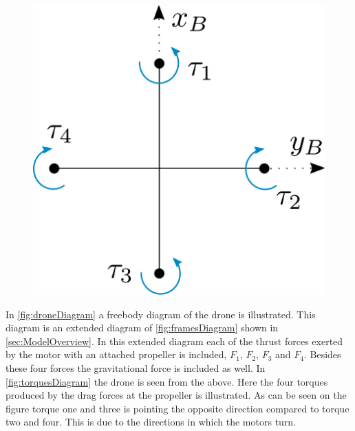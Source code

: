\begin{minipage}{\linewidth}
\begin{minipage}{0.6\linewidth}
\begin{figure}[H]
			\label{fig:droneDiagram}
		\end{figure}
	\end{minipage}
	\hspace{0.03\linewidth}
	\begin{minipage}{0.35\linewidth}
		\begin{figure}[H] \vspace{20mm}
			\includegraphics[scale=.4]{figures/torquesDiagram}
			\centering
            \vspace{10mm}
			\label{fig:torquesDiagram}
		\end{figure}
	\end{minipage}
\end{minipage}

In \autoref{fig:droneDiagram} a freebody diagram of the drone is illustrated. This diagram is an extended diagram of \autoref{fig:framesDiagram} shown in \autoref{sec:ModelOverview}. In this extended diagram each of the thrust forces exerted by the motor with an attached propeller is included, $F_1$, $F_2$, $F_3$ and $F_4$. Besides these four forces the gravitational force is included as well. In \autoref{fig:torquesDiagram} the drone is seen from the above. Here the four torques produced by the drag forces at the propeller is illustrated. As can be seen on the figure torque one and three is pointing the opposite direction compared to torque two and four. This is due to the directions in which the motors turn.  

